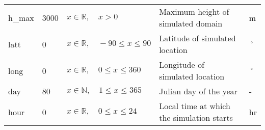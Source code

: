 \documentclass[twoside,11pt,fleqn,a4paper,english,openright]{report}
\begin{document}
\begin{center}
\begin{supertabular}{|l|p{1.6cm}|p{4cm}|p{6.3cm}|l|}
  h\_max	&	3000			& $x \in \mathbb{R}, \quad x > 0$		& Maximum height of simulated domain	&	m\\
  latt		&	0					& $x \in \mathbb{R}, \quad -90 \leq x \leq 90$	&	Latitude of simulated location	&	$\,^{\circ}$ \\
  long		&	0					&	$x \in \mathbb{R}, \quad 0 \leq x \leq 360$		& Longitude	of simulated location	& $\,^{\circ}$\\
  day			& 80				&	$x \in \mathbb{N}, \quad 1 \leq x \leq 365$		&	Julian day of the year	&	-\\
  hour		&	0					& $x \in \mathbb{R}, \quad 0 \leq x \leq 24$		& Local time at which the simulation starts	&	hr\\
\end{supertabular}
\end{center}

\newpage
\end{document}
